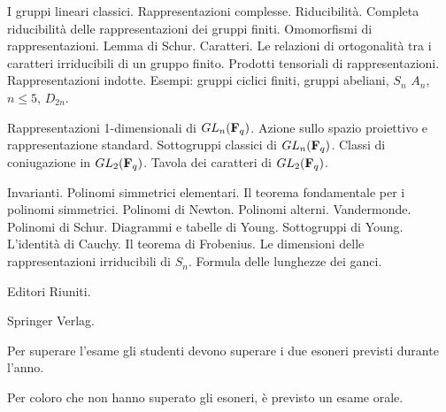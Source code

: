    
\def\abbrcorso{GE7}
\def\titolocorso{Geometria Superiore}
\def\sottotitolo{Rappresentazioni di Gruppi finiti}
\def\docente{Prof. Francesco Pappalardi}
\def\crediti{7}
\def\semestre{I}
\def\esoneri{1}
\def\scrittofinale{0}
\def\oralefinale{1}
\def\altreprove{0}
\Intestazione  


I gruppi lineari classici. Rappresentazioni complesse. Riducibilit\`a.
Completa riducibilit\`a delle rappresentazioni dei gruppi finiti.
Omomorfismi di
rappresentazioni. Lemma di Schur. Caratteri. Le relazioni di
ortogonalit\`a tra i
caratteri irriducibili di un gruppo finito. 
Prodotti tensoriali di rappresentazioni. Rappresentazioni indotte.
Esempi: gruppi ciclici
finiti, gruppi abeliani, $S_n$ $A_n$, $n\le 5$, $D_{2n}$.


Rappresentazioni 1-dimensionali di $GL_n({\bf F}_q)$. Azione sullo spazio
proiettivo e rappresentazione standard. Sottogruppi classici di
$GL_n({\bf F}_q)$.
Classi di coniugazione in $GL_2({\bf F}_q)$. Tavola dei caratteri di
$GL_2({\bf F}_q)$.



Invarianti. Polinomi simmetrici elementari. Il teorema fondamentale per
i polinomi
simmetrici. Polinomi di Newton. Polinomi alterni. Vandermonde. Polinomi di Schur. 
Diagrammi e tabelle di Young. Sottogruppi di Young.
L'identit\`a di
Cauchy. Il teorema
di Frobenius. Le dimensioni delle rappresentazioni irriducibili di
$S_n$. Formula delle lunghezze dei ganci. 

\testi 

\bib
{}
\endbib

\bib
{}
\endbib

\bib
{}

\bib
{}
{\eightrm Editori Riuniti.}

\bib
{}
{\eightrm Springer Verlag.}
\endbib


\esami 

Per superare l'esame gli studenti devono superare i due esoneri previsti 
durante l'anno. 

Per coloro che non  hanno superato gli esoneri, \`{e} previsto un esame orale.
\bye
